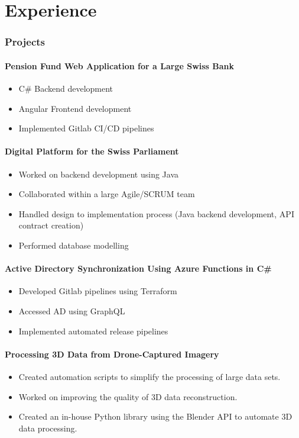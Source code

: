 \section{Experience}
\subsubsection*{Projects}
\paragraph{Pension Fund Web Application for a Large Swiss Bank}
\begin{itemize}
    \item C\# Backend development
    \item Angular Frontend development
    \item Implemented Gitlab CI/CD pipelines
\end{itemize}
\paragraph{Digital Platform for the Swiss Parliament}
\begin{itemize}
    \item Worked on backend development using Java
    \item Collaborated within a large Agile/SCRUM team
    \item Handled design to implementation process (Java backend development, API contract creation)
    \item Performed database modelling
\end{itemize}
\paragraph{Active Directory Synchronization Using Azure Functions in C\#}
\begin{itemize}
    \item Developed Gitlab pipelines using Terraform
    \item Accessed AD using GraphQL
    \item Implemented automated release pipelines
\end{itemize}
\vspace{1.25em}
\dottedline
{}
\vspace{-1em}
\paragraph{Processing 3D Data from Drone-Captured Imagery}
\begin{itemize}
\item Created automation scripts to simplify the processing of large data sets.
\item Worked on improving the quality of 3D data reconstruction.
\item Created an in-house Python library using the Blender API to automate 3D data processing.
\end{itemize}